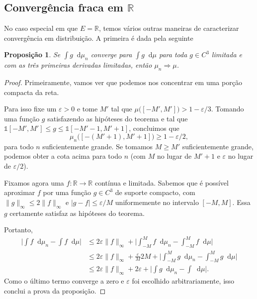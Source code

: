 \documentclass[reqno]{article}
\newcommand*\1{\mathds{1}}
\newtheorem{proposition}[theorem]{Proposição}
\renewcommand*\d{\mathop{}\!\mathrm{d}}
\begin{document}
\subsection{Convergência fraca em $\mathbb{R}$}

No caso especial em que $E = \mathbb{R}$, temos vários outras maneiras de caracterizar convergência em distribuição.
A primeira é dada pela seguinte

\begin{proposition}
  \label{p:conv_distr_suave}
  Se $\int g \d \mu_n$ converge para $\int g \d \mu$ para toda $g \in C^3$ limitada e com as três primeiras derivadas limitadas, então $\mu_n \Rightarrow \mu$.
\end{proposition}

\begin{proof}
  Primeiramente, vamos ver que podemos nos concentrar em uma porção compacta da reta.

  Para isso fixe um $\varepsilon > 0$ e tome $M'$ tal que $\mu\big( [-M', M'] \big) > 1 - \varepsilon / 3$.
  Tomando uma função $g$ satisfazendo as hipóteses do teorema e tal que $\1{[-M',M']} \leq g \leq \1{[-M'-1,M'+1]}$, concluimos que
  \begin{equation}
    \mu_n \big( [-(M'+1), M'+1] \big) \geq 1 - \varepsilon/2,
  \end{equation}
  para todo $n$ suficientemente grande.
  Se tomamos $M \geq M'$ suficientemente grande, podemos obter a cota acima para todo $n$ (com $M$ no lugar de $M'+1$ e $\varepsilon$ no lugar de $\varepsilon/2$).

  Fixamos agora uma $f: \mathbb{R} \to \mathbb{R}$ contínua e limitada.
  Sabemos que é possível aproximar $f$ por uma função $g \in C^3$ de suporte compacto, com $\lVert g \rVert_\infty \leq 2 \lVert f \rVert_\infty$ e $|g - f| \leq \varepsilon/M$ uniformemente no intervalo $[-M,M]$.
  Essa $g$ certamente satisfaz as hipóteses do teorema.

  Portanto,
  \begin{equation*}
    \begin{split}
      \Big| \int f \d \mu_n - \int f \d \mu\Big| & \leq 2 \varepsilon \lVert f \rVert_\infty + \Big| \int_{-M}^M f \d \mu_n - \int_{-M}^M f \d \mu\Big|\\
      & \leq 2 \varepsilon \lVert f \rVert_\infty + \frac \varepsilon{M} 2 M + \Big| \int_{-M}^M g \d \mu_n - \int_{-M}^M g \d \mu\Big|\\
      & \leq 2 \varepsilon \lVert f \rVert_\infty + 2 \varepsilon + \Big| \int g \d \mu_n - \int \d \mu\Big|.
    \end{split}
  \end{equation*}
  Como o último termo converge a zero e $\varepsilon$ foi escolhido arbitrariamente, isso conclui a prova da proposição.
\end{proof}
\end{document}

